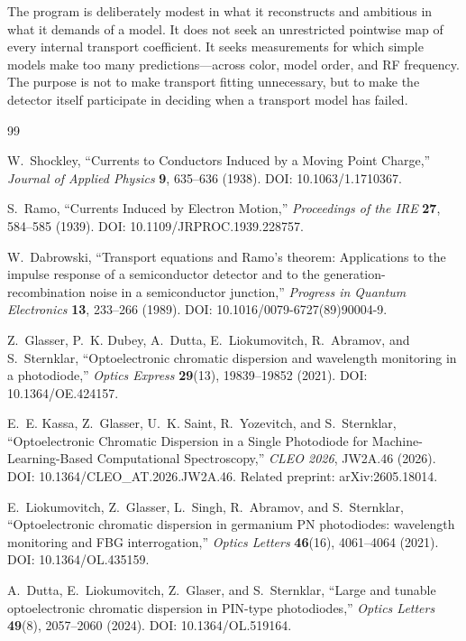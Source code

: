 \documentclass[11pt]{article}
\begin{document}
The program is deliberately modest in what it reconstructs and ambitious in what it demands of a model. It does not seek an unrestricted pointwise map of every internal transport coefficient. It seeks measurements for which simple models make too many predictions---across color, model order, and RF frequency. The purpose is not to make transport fitting unnecessary, but to make the detector itself participate in deciding when a transport model has failed.

\begin{thebibliography}{99}

W.~Shockley, ``Currents to Conductors Induced by a Moving Point Charge,'' \emph{Journal of Applied Physics} \textbf{9}, 635--636 (1938). DOI: 10.1063/1.1710367.

S.~Ramo, ``Currents Induced by Electron Motion,'' \emph{Proceedings of the IRE} \textbf{27}, 584--585 (1939). DOI: 10.1109/JRPROC.1939.228757.

W.~Dabrowski, ``Transport equations and Ramo's theorem: Applications to the impulse response of a semiconductor detector and to the generation-recombination noise in a semiconductor junction,'' \emph{Progress in Quantum Electronics} \textbf{13}, 233--266 (1989). DOI: 10.1016/0079-6727(89)90004-9.

Z.~Glasser, P.~K. Dubey, A.~Dutta, E.~Liokumovitch, R.~Abramov, and S.~Sternklar, ``Optoelectronic chromatic dispersion and wavelength monitoring in a photodiode,'' \emph{Optics Express} \textbf{29}(13), 19839--19852 (2021). DOI: 10.1364/OE.424157.

E.~E. Kassa, Z.~Glasser, U.~K. Saint, R.~Yozevitch, and S.~Sternklar, ``Optoelectronic Chromatic Dispersion in a Single Photodiode for Machine-Learning-Based Computational Spectroscopy,'' \emph{CLEO 2026}, JW2A.46 (2026). DOI: 10.1364/CLEO\_AT.2026.JW2A.46. Related preprint: arXiv:2605.18014.

E.~Liokumovitch, Z.~Glasser, L.~Singh, R.~Abramov, and S.~Sternklar, ``Optoelectronic chromatic dispersion in germanium PN photodiodes: wavelength monitoring and FBG interrogation,'' \emph{Optics Letters} \textbf{46}(16), 4061--4064 (2021). DOI: 10.1364/OL.435159.

A.~Dutta, E.~Liokumovitch, Z.~Glaser, and S.~Sternklar, ``Large and tunable optoelectronic chromatic dispersion in PIN-type photodiodes,'' \emph{Optics Letters} \textbf{49}(8), 2057--2060 (2024). DOI: 10.1364/OL.519164.


\end{thebibliography}
\end{document}
